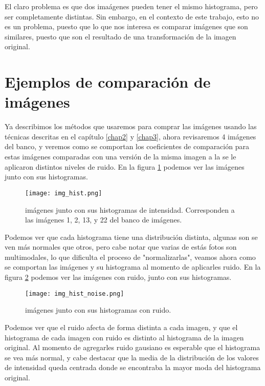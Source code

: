 El claro problema es que dos ima\'agenes pueden tener el mismo histograma, pero ser completamente distintas. Sin embargo, en el contexto de este trabajo, esto no es un problema, puesto que lo que nos interesa es comparar im\'agenes que son similares, puesto que son el resultado de una transformaci\'on de la imagen original.

\section{Ejemplos de comparaci\'on de im\'agenes}

Ya describimos los m\'etodos que usaremos para comprar las im\'agenes usando las t\'ecnicas descritas en el cap\'itulo \ref{chap2} y \ref{chap3}, ahora revisaremos 4 im\'agenes del banco, y veremos como se comportan los coeficientes de comparaci\'on para estas im\'agenes comparadas con una versi\'on de la misma imagen a la se le aplicaron distintos niveles de ruido. En la figura \ref{fig:img_hist} podemos ver las im\'agenes junto con sus histogramas.

\begin{figure}[H]
    \centering
    \texttt{[image: img\_hist.png]}
    \caption{im\'agenes junto con sus histogramas de intensidad. Corresponden a las im\'agenes 1, 2, 13, y 22 del banco de im\'agenes.}
    \label{fig:img_hist}
\end{figure}

Podemos ver que cada histograma tiene una distribuci\'on distinta, algunas son se ven m\'as normales que otros, pero cabe notar que varias de est\'as fotos son multimodales, lo que dificulta el proceso de "normalizarlas", veamos ahora como se comportan las im\'agenes y su histograma al momento de aplicarles ruido. En la figura \ref{fig:img_hist_ruido} podemos ver las im\'agenes con ruido, junto con sus histogramas.

\begin{figure}[H]
    \centering
    \texttt{[image: img\_hist\_noise.png]}
    \caption{im\'agenes junto con sus histogramas con ruido.}
    \label{fig:img_hist_ruido}
\end{figure}

Podemos ver que el ruido afecta de forma distinta a cada imagen, y que el histograma de cada imagen con ruido es distinto al histograma de la imagen original. Al momento de agregarles ruido gausiano es esperable que el histograma se vea más normal, y cabe destacar que la media de la distribución de los valores de intensidad queda centrada donde se encontraba la mayor moda del histograma original. 


